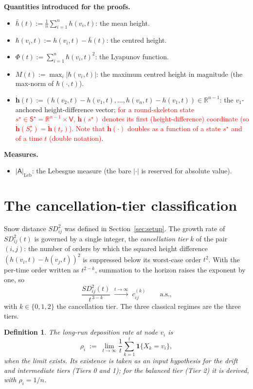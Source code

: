 \documentclass[11pt]{article}
\newtheorem{dfn}{Definition}
\theoremstyle{definition}
\begin{document}
\noindent\textbf{Quantities introduced for the proofs.}
\begin{itemize}
  \item $\bar h(t) := \frac{1}{n}\sum_{i=1}^n h(v_i, t)$: the mean height.
  \item $\hbar(v_i, t) := h(v_i, t) - \bar h(t)$: the centred height.
  \item $\Phi(t) := \sum_{i=1}^n \hbar(v_i, t)^2$: the Lyapunov function.
  \item $M(t) := \max_i |\hbar(v_i, t)|$: the maximum centred height in magnitude (the max-norm of $\hbar(\cdot, t)$).
  \item $\mathring{\mathbf{h}}(t) := (h(v_2,t) - h(v_1,t), \ldots, h(v_n,t) - h(v_1,t)) \in \mathbb{R}^{n-1}$: the $v_1$-anchored height-difference vector; \textcolor{red}{for a round-skeleton state $s^{\star}\in\mathsf{S}^{\star} = \mathbb{R}^{n-1}\times\mathsf{V}$, $\mathring{\mathbf{h}}(s^{\star})$ denotes its first (height-difference) coordinate (so $\mathring{\mathbf{h}}(S^{\star}_r) = \mathring{\mathbf{h}}(t_r)$). Note that $\mathring{\mathbf{h}}(\cdot)$ doubles as a function of a state $s^{\star}$ and of a time $t$ (double notation)}.
\end{itemize}

\noindent\textbf{Measures.}
\begin{itemize}
  \item $|\mathsf{A}|_{\mathrm{Leb}}$: the Lebesgue measure (the bare $|\cdot|$ is reserved for absolute value).
\end{itemize}



\section{The cancellation-tier classification}
\label{sec:regimes}

Snow distance $SD^2_{ij}$ was defined in Section~\ref{sec:setup}. The growth rate of $SD^2_{ij}(t)$ is governed by a single integer, the \emph{cancellation tier} $k$ of the pair $(i,j)$: the number of orders by which the squared height difference $(h(v_i,t)-h(v_j,t))^2$ is suppressed below its worst-case order $t^2$. With the per-time order written as $t^{2-k}$, summation to the horizon raises the exponent by one, so
\[
  \frac{SD^2_{ij}(t)}{t^{\,3-k}} \;\xrightarrow{t\to\infty}\; c^{(k)}_{ij} \qquad\text{a.s.,}
\]
with $k\in\{0,1,2\}$ the cancellation tier. The three classical regimes are the three tiers.

\begin{dfn}
\label{dfn:rho}
The \emph{long-run deposition rate} at node $v_i$ is
\[
  \rho_i \;:=\; \lim_{t\to\infty} \frac{1}{t}\sum_{k=1}^{t} \mathbf{1}\{X_k = v_i\},
\]
when the limit exists. Its existence is taken as an input hypothesis for the drift and intermediate tiers (Tiers 0 and 1); for the balanced tier (Tier 2) it is \emph{derived}, with $\rho_i = 1/n$.
\end{dfn}
\end{document}
